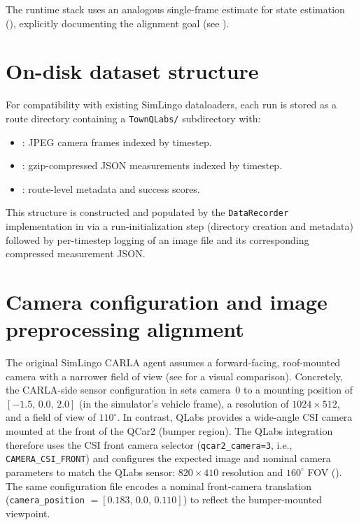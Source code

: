 The runtime stack uses an analogous single-frame estimate for state estimation (), explicitly documenting the alignment goal (see ).

\section{On-disk dataset structure}
\label{sec:dataset-structure}
For compatibility with existing SimLingo dataloaders, each run is stored as a route directory containing a \texttt{TownQLabs/} subdirectory with:
\begin{itemize}[leftmargin=*,itemsep=0.25em]
  \item {}: JPEG camera frames indexed by timestep.
  \item {}: gzip-compressed JSON measurements indexed by timestep.
  \item {}: route-level metadata and success scores.
\end{itemize}
This structure is constructed and populated by the \texttt{DataRecorder} implementation in  via a run-initialization step (directory creation and metadata) followed by per-timestep logging of an image file and its corresponding compressed measurement JSON.

\section{Camera configuration and image preprocessing alignment}
\label{sec:camera-config-preproc}
The original SimLingo CARLA agent assumes a forward-facing, roof-mounted camera with a narrower field of view (see  for a visual comparison). Concretely, the CARLA-side sensor configuration in  sets camera~0 to a mounting position of $[-1.5,\,0.0,\,2.0]$ (in the simulator's vehicle frame), a resolution of $1024\times512$, and a field of view of $110^{\circ}$. In contrast, QLabs provides a wide-angle CSI camera mounted at the front of the QCar2 (bumper region). The QLabs integration therefore uses the CSI front camera selector (\texttt{qcar2\_camera=3}, i.e., \texttt{CAMERA\_CSI\_FRONT}) and configures the expected image and nominal camera parameters to match the QLabs sensor: $820\times410$ resolution and $160^{\circ}$ FOV (). The same configuration file encodes a nominal front-camera translation (\texttt{camera\_position} $=[0.183,\,0.0,\,0.110]$) to reflect the bumper-mounted viewpoint.

